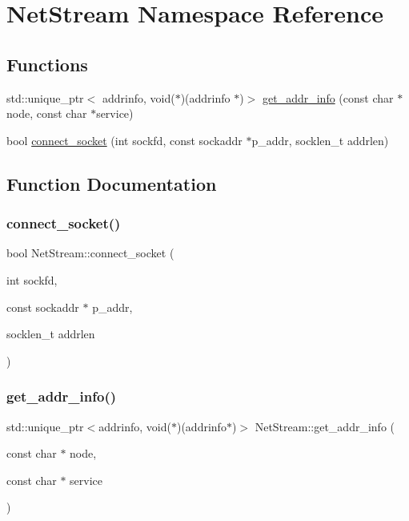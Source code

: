\hypertarget{namespace_net_stream}{}\section{Net\+Stream Namespace Reference}
\label{namespace_net_stream}
\subsection*{Functions}
\begin{DoxyCompactItemize}
\item 
std\+::unique\+\_\+ptr$<$ addrinfo, void($\ast$)(addrinfo $\ast$)$>$ \hyperlink{namespace_net_stream_a16439cfeb72360d45966b99b4a7b3382}{get\+\_\+addr\+\_\+info} (const char $\ast$node, const char $\ast$service)
\item 
bool \hyperlink{namespace_net_stream_a6a60ac76dea0a753f8ddea79f5307d16}{connect\+\_\+socket} (int sockfd, const sockaddr $\ast$p\+\_\+addr, socklen\+\_\+t addrlen)
\end{DoxyCompactItemize}


\subsection{Function Documentation}
\hypertarget{namespace_net_stream_a6a60ac76dea0a753f8ddea79f5307d16}{}\label{namespace_net_stream_a6a60ac76dea0a753f8ddea79f5307d16} 
\subsubsection{\texorpdfstring{connect\+\_\+socket()}{connect\_socket()}}
{\footnotesize\ttfamily bool Net\+Stream\+::connect\+\_\+socket (\begin{DoxyParamCaption}\item[{int}]{sockfd,  }\item[{const sockaddr $\ast$}]{p\+\_\+addr,  }\item[{socklen\+\_\+t}]{addrlen }\end{DoxyParamCaption})}

\hypertarget{namespace_net_stream_a16439cfeb72360d45966b99b4a7b3382}{}\label{namespace_net_stream_a16439cfeb72360d45966b99b4a7b3382} 
\subsubsection{\texorpdfstring{get\+\_\+addr\+\_\+info()}{get\_addr\_info()}}
{\footnotesize\ttfamily std\+::unique\+\_\+ptr$<$addrinfo, void($\ast$)(addrinfo$\ast$)$>$ Net\+Stream\+::get\+\_\+addr\+\_\+info (\begin{DoxyParamCaption}\item[{const char $\ast$}]{node,  }\item[{const char $\ast$}]{service }\end{DoxyParamCaption})}

